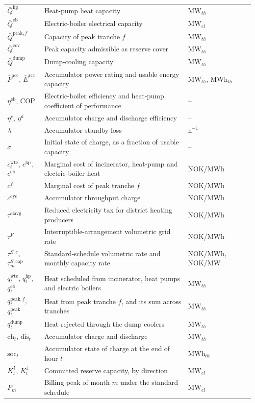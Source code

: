 \begin{table}[!htbp]
\begin{tabular}{p{2.4cm} p{8.9cm} p{2.3cm}}
$\bar{Q}^{\text{hp}}$ & Heat-pump heat capacity & MW$_{th}$ \\
$\bar{Q}^{\text{eb}}$ & Electric-boiler electrical capacity & MW$_{el}$ \\
$\bar{Q}^{\text{peak},f}$ & Capacity of peak tranche $f$ & MW$_{th}$ \\
$\bar{Q}^{\text{cov}}$ & Peak capacity admissible as reserve cover & MW$_{th}$ \\
$\bar{Q}^{\text{dump}}$ & Dump-cooling capacity & MW$_{th}$ \\
$\bar{P}^{\text{acc}}$, $\bar{E}^{\text{acc}}$ & Accumulator power rating and usable energy capacity & MW$_{th}$, MWh$_{th}$ \\
$\eta^{\text{eb}}$, $\text{COP}$ & Electric-boiler efficiency and heat-pump coefficient of performance & -- \\
$\eta^{c}$, $\eta^{d}$ & Accumulator charge and discharge efficiency & -- \\
$\lambda$ & Accumulator standby loss & h$^{-1}$ \\
$\sigma$ & Initial state of charge, as a fraction of usable capacity & -- \\
$c^{\text{wte}}_t$, $c^{\text{hp}}$, $c^{\text{eb}}$ & Marginal cost of incinerator, heat-pump and electric-boiler heat & NOK/MWh \\
$c^{f}$ & Marginal cost of peak tranche $f$ & NOK/MWh \\
$c^{\text{cyc}}$ & Accumulator throughput charge & NOK/MWh \\
$\tau^{\text{elavg}}$ & Reduced electricity tax for district heating producers & NOK/MWh \\
$\tau^{V}$ & Interruptible-arrangement volumetric grid rate & NOK/MWh \\
$\tau^{S,e}$, $\tau^{S,\text{cap}}_m$ & Standard-schedule volumetric rate and monthly capacity rate & NOK/MWh, NOK/MW \\
\addlinespace
\multicolumn{3}{l}{\textbf{Decision variables}} \\
$q^{\text{wte}}_t$, $q^{\text{hp}}_t$, $q^{\text{eb}}_t$ & Heat scheduled from incinerator, heat pumps and electric boilers & MW$_{th}$ \\
$q^{\text{peak},f}_t$, $q^{\text{peak}}_t$ & Heat from peak tranche $f$, and its sum across tranches & MW$_{th}$ \\
$q^{\text{dump}}_t$ & Heat rejected through the dump coolers & MW$_{th}$ \\
$\text{ch}_t$, $\text{dis}_t$ & Accumulator charge and discharge & MW$_{th}$ \\
$\text{soc}_t$ & Accumulator state of charge at the end of hour $t$ & MWh$_{th}$ \\
$K^{\uparrow}_t$, $K^{\downarrow}_t$ & Committed reserve capacity, by direction & MW$_{el}$ \\
$P_m$ & Billing peak of month $m$ under the standard schedule & MW$_{el}$ \\
\bottomrule
\end{tabular}
\label{tab:3.4.1 nomenclature}
\end{table}

